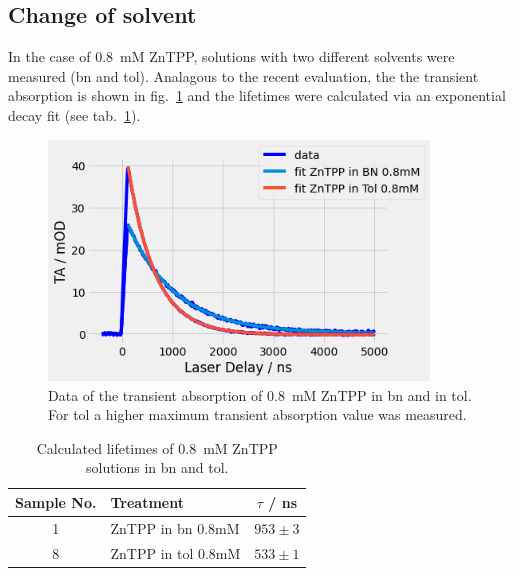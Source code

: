 
\subsection*{Change of solvent}

In the case of \SI{0.8}{\milli\nauticalmile} ZnTPP, solutions with two different solvents were measured (bn and tol). Analagous to the recent evaluation, the the transient absorption is shown in fig.~\ref{fig:ZnTPP-bn-tol} and the lifetimes were calculated via an exponential decay fit (see tab.~\ref{fig:ZnTPP-bn-tol}).

\begin{figure}[h]
    \centering
    \includegraphics[width = 0.9\textwidth]{Bilder/Auswertung/TRAS/ZnTPP-bn-tol.png}
    \caption{Data of the transient absorption of \SI{0.8}{\milli\nauticalmile} ZnTPP in bn and in tol. For tol a higher maximum transient absorption value was measured.}
    \label{fig:ZnTPP-bn-tol}
\end{figure}


\begin{table}[ht]
    \centering
    \begin{tabular}{clc}
        \toprule
        Sample No. &    Treatment &    $\tau$ / \si{\nano\second} \\
        \midrule
        1 &     ZnTPP in bn 0.8mM &  $953 \pm 3$ \\
        8 &    ZnTPP in tol 0.8mM &  $533 \pm 1$ \\
        \bottomrule
    \end{tabular}
    \caption{Calculated lifetimes of \SI{0.8}{\milli\nauticalmile} ZnTPP solutions in bn and tol.}
    \label{tab:ZnTPP-bn-tol}
\end{table}